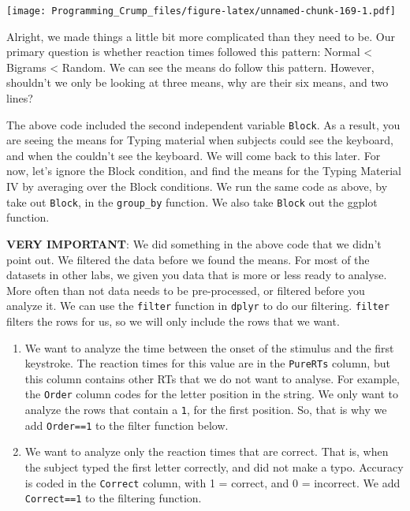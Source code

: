 \documentclass[]{book}
\theoremstyle{definition}
\theoremstyle{definition}
\theoremstyle{definition}
\theoremstyle{remark}
\begin{document}
\texttt{[image: Programming\_Crump\_files/figure-latex/unnamed-chunk-169-1.pdf]}

Alright, we made things a little bit more complicated than they need to
be. Our primary question is whether reaction times followed this
pattern: Normal \textless{} Bigrams \textless{} Random. We can see the
means do follow this pattern. However, shouldn't we only be looking at
three means, why are their six means, and two lines?

The above code included the second independent variable \texttt{Block}.
As a result, you are seeing the means for Typing material when subjects
could see the keyboard, and when the couldn't see the keyboard. We will
come back to this later. For now, let's ignore the Block condition, and
find the means for the Typing Material IV by averaging over the Block
conditions. We run the same code as above, by take out \texttt{Block},
in the \texttt{group\_by} function. We also take \texttt{Block} out the
ggplot function.

\textbf{VERY IMPORTANT}: We did something in the above code that we
didn't point out. We filtered the data before we found the means. For
most of the datasets in other labs, we given you data that is more or
less ready to analyse. More often than not data needs to be
pre-processed, or filtered before you analyze it. We can use the
\texttt{filter} function in \texttt{dplyr} to do our filtering.
\texttt{filter} filters the rows for us, so we will only include the
rows that we want.

\begin{enumerate}
\def\labelenumi{\arabic{enumi}.}
\item
  We want to analyze the time between the onset of the stimulus and the
  first keystroke. The reaction times for this value are in the
  \texttt{PureRTs} column, but this column contains other RTs that we do
  not want to analyse. For example, the \texttt{Order} column codes for
  the letter position in the string. We only want to analyze the rows
  that contain a \texttt{1}, for the first position. So, that is why we
  add \texttt{Order==1} to the filter function below.
\item
  We want to analyze only the reaction times that are correct. That is,
  when the subject typed the first letter correctly, and did not make a
  typo. Accuracy is coded in the \texttt{Correct} column, with 1 =
  correct, and 0 = incorrect. We add \texttt{Correct==1} to the
  filtering function.
\end{enumerate}
\end{document}
